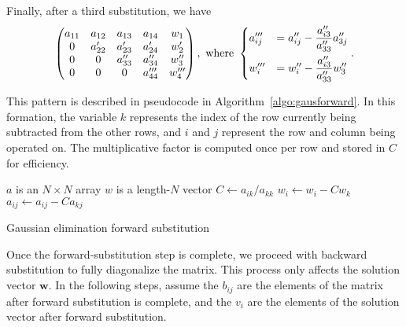 \documentclass{article}
\begin{document}
        Finally, after a third substitution, we have
        \begin{equation*}
            \begin{pmatrix}
                a_{11} & a_{12}  & a_{13}   & a_{14}    & w_1   \\
                0      & a'_{22} & a'_{23}  & a'_{24}   & w'_2  \\
                0      & 0       & a''_{33} & a''_{34}  & w''_3 \\
                0      & 0       & 0        & a'''_{44} & w'''_4 \\
            \end{pmatrix}, \text{ where }
            \begin{dcases}
                a'''_{ij} &= a''_{ij} - \frac{a''_{i3}}{a''_{33}} a''_{3j} \\
                w'''_i    &= w''_i - \frac{a''_{i3}}{a''_{33}} w''_3
            \end{dcases}.
        \end{equation*}

        This pattern is described in pseudocode in Algorithm~\ref{algo:gausforward}. In this formation, the variable $k$ represents the index of the row currently being subtracted from the other rows, and $i$ and $j$ represent the row and column being operated on. The multiplicative factor is computed once per row and stored in $C$ for efficiency.

        \begin{algorithm}
            \begin{algorithmic}
                \Require $a$ is an $N \times N$ array
                \Require $w$ is a length-$N$ vector
                        \State $C \gets a_{ik} / a_{kk}$
                        \State $w_i \gets w_i - C w_k$
                            \State $a_{ij} \gets a_{ij} - C a_{kj}$
                        \EndFor
                    \EndFor
                \EndFor
            \end{algorithmic}
            \caption{Gaussian elimination forward substitution}
            \label{algo:gausforward}
        \end{algorithm}

        Once the forward-substitution step is complete, we proceed with backward substitution to fully diagonalize the matrix. This process only affects the solution vector $\mathbf{w}$. In the following steps, assume the $b_{ij}$ are the elements of the matrix after forward substitution is complete, and the $v_i$ are the elements of the solution vector after forward substitution.
\end{document}
